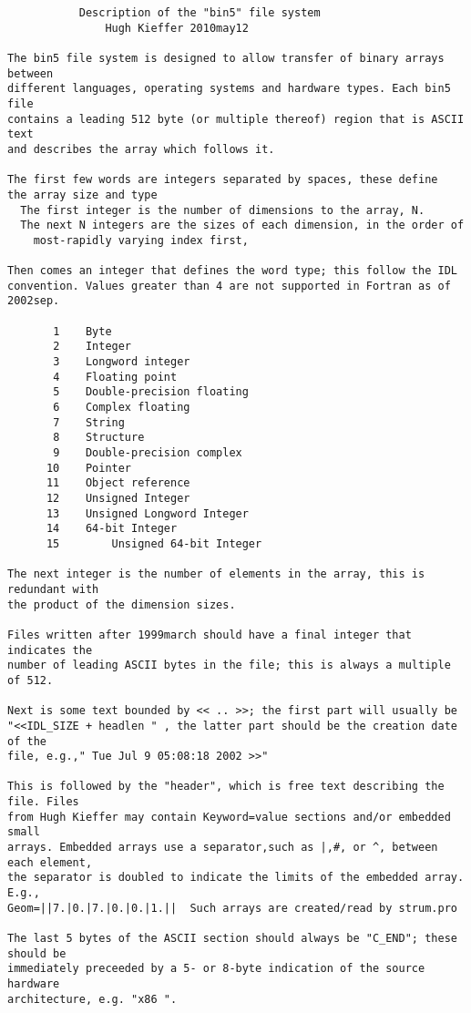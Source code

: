 \begin{verbatim}
           Description of the "bin5" file system  
               Hugh Kieffer 2010may12

The bin5 file system is designed to allow transfer of binary arrays between
different languages, operating systems and hardware types. Each bin5 file
contains a leading 512 byte (or multiple thereof) region that is ASCII text
and describes the array which follows it.

The first few words are integers separated by spaces, these define 
the array size and type
  The first integer is the number of dimensions to the array, N.
  The next N integers are the sizes of each dimension, in the order of 
    most-rapidly varying index first, 

Then comes an integer that defines the word type; this follow the IDL
convention. Values greater than 4 are not supported in Fortran as of 2002sep.

       1	Byte	
       2	Integer	
       3	Longword integer	
       4	Floating point	
       5	Double-precision floating	
       6	Complex floating	
       7	String	
       8	Structure	
       9	Double-precision complex	
      10	Pointer	
      11	Object reference	
      12	Unsigned Integer	
      13	Unsigned Longword Integer	
      14	64-bit Integer	
      15        Unsigned 64-bit Integer

The next integer is the number of elements in the array, this is redundant with
the product of the dimension sizes.

Files written after 1999march should have a final integer that indicates the
number of leading ASCII bytes in the file; this is always a multiple of 512.

Next is some text bounded by << .. >>; the first part will usually be
"<<IDL_SIZE + headlen " , the latter part should be the creation date of the
file, e.g.," Tue Jul 9 05:08:18 2002 >>"

This is followed by the "header", which is free text describing the file. Files
from Hugh Kieffer may contain Keyword=value sections and/or embedded small
arrays. Embedded arrays use a separator,such as |,#, or ^, between each element,
the separator is doubled to indicate the limits of the embedded array.  E.g.,
Geom=||7.|0.|7.|0.|0.|1.||  Such arrays are created/read by strum.pro

The last 5 bytes of the ASCII section should always be "C_END"; these should be
immediately preceeded by a 5- or 8-byte indication of the source hardware
architecture, e.g. "x86 ".


\end{verbatim}
